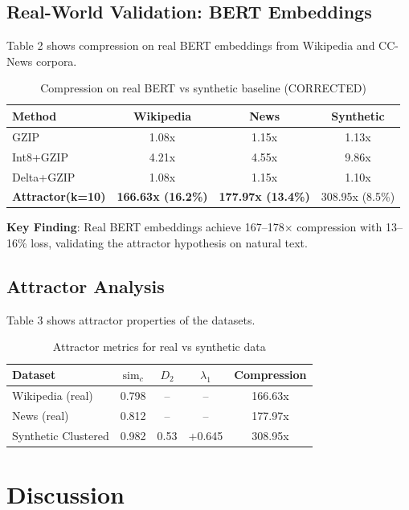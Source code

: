 \documentclass[utf8]{FrontiersinVancouver}
\begin{document}
\subsection{Real-World Validation: BERT Embeddings}

Table 2 shows compression on real BERT embeddings from Wikipedia and CC-News corpora.

\begin{table}[h]
\centering
\caption{Compression on real BERT vs synthetic baseline (CORRECTED)}
\small
\begin{tabular}{@{}lccc@{}}
\toprule
\textbf{Method} & \textbf{Wikipedia} & \textbf{News} & \textbf{Synthetic} \\
\midrule
GZIP & 1.08x & 1.15x & 1.13x \\
Int8+GZIP & 4.21x & 4.55x & 9.86x \\
Delta+GZIP & 1.08x & 1.15x & 1.10x \\
\textbf{Attractor(k=10)} & \textbf{166.63x (16.2\%)} & \textbf{177.97x (13.4\%)} & 308.95x (8.5\%) \\
\bottomrule
\end{tabular}
\end{table}

\textbf{Key Finding}: Real BERT embeddings achieve 167--178$\times$ compression with 13--16\% loss, validating the attractor hypothesis on natural text.

\subsection{Attractor Analysis}

Table 3 shows attractor properties of the datasets.

\begin{table}[h]
\centering
\caption{Attractor metrics for real vs synthetic data}
\small
\begin{tabular}{@{}lcccc@{}}
\toprule
\textbf{Dataset} & \textbf{$\text{sim}_c$} & \textbf{$D_2$} & \textbf{$\lambda_1$} & \textbf{Compression} \\
\midrule
Wikipedia (real) & 0.798 & -- & -- & 166.63x \\
News (real) & 0.812 & -- & -- & 177.97x \\
Synthetic Clustered & 0.982 & 0.53 & +0.645 & 308.95x \\
\bottomrule
\end{tabular}
\end{table}

\section{Discussion}
\end{document}
